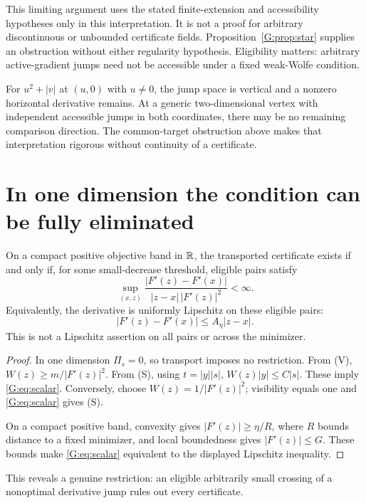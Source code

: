 This limiting argument uses the stated finite-extension and accessibility hypotheses only in this interpretation. It is not a proof for arbitrary discontinuous or unbounded certificate fields. Proposition~\ref{G:prop:star} supplies an obstruction without either regularity hypothesis. Eligibility matters: arbitrary active-gradient jumps need not be accessible under a fixed weak-Wolfe condition.

For $u^2+|v|$ at $(u,0)$ with $u\ne0$, the jump space is vertical and a nonzero horizontal derivative remains. At a generic two-dimensional vertex with independent accessible jumps in both coordinates, there may be no remaining comparison direction. The common-target obstruction above makes that interpretation rigorous without continuity of a certificate.


\setcounter{section}{5}
\setcounter{theorem}{0}
\setcounter{equation}{5}
\section{In one dimension the condition can be fully eliminated}
\begin{proposition}
On a compact positive objective band in $\mathbb R$, the transported certificate exists if and only if, for some small-decrease threshold, eligible pairs satisfy
\begin{equation}
 \sup_{(x,z)}\frac{|F'(z)-F'(x)|}{|z-x|\,|F'(z)|^2}<\infty. \label{G:eq:scalar}
\end{equation}
Equivalently, the derivative is uniformly Lipschitz on these eligible pairs:
\[
 |F'(z)-F'(x)|\le A_\eta|z-x|.
\]
This is not a Lipschitz assertion on all pairs or across the minimizer.
\end{proposition}
\begin{proof}
In one dimension $\Pi_s=0$, so transport imposes no restriction. From (V),
$W(z)\ge m/|F'(z)|^2$. From (S), using $t=|y||s|$,
$W(z)|y|\le C|s|$. These imply \eqref{G:eq:scalar}. Conversely, choose
$W(z)=1/|F'(z)|^2$; visibility equals one and \eqref{G:eq:scalar} gives (S).

On a compact positive band, convexity gives $|F'(z)|\ge\eta/R$, where $R$ bounds distance to a fixed minimizer, and local boundedness gives $|F'(z)|\le G$. These bounds make \eqref{G:eq:scalar} equivalent to the displayed Lipschitz inequality.
\end{proof}
This reveals a genuine restriction: an eligible arbitrarily small crossing of a nonoptimal derivative jump rules out every certificate.

